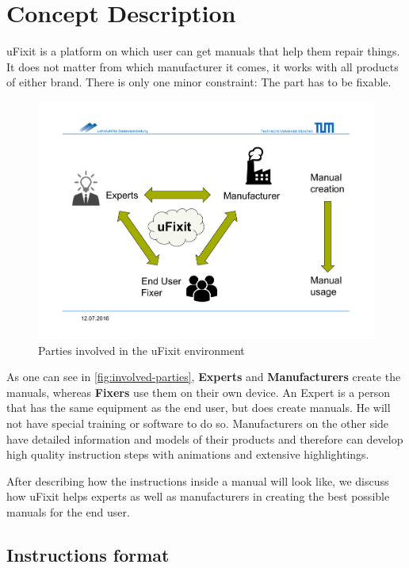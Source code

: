 
\chapter{Concept Description}

	uFixit is a platform on which user can get manuals that help them repair things. It does not matter from which manufacturer it comes, it works with all products of either brand. There is only one minor constraint: The part has to be fixable.
	
	\begin{figure}[H]
		\includegraphics[width=\textwidth, trim=0cm 3cm 0cm 4cm, clip]{../images/involved-parties.pdf}
		\centering
		\caption{Parties involved in the uFixit environment}
		\label{fig:involved-parties}
	\end{figure}

	As one can see in \autoref{fig:involved-parties}, \textbf{Experts} and \textbf{Manufacturers} create the manuals, whereas \textbf{Fixers} use them on their own device. An Expert is a person that has the same equipment as the end user, but does create manuals. He will not have special training or software to do so. Manufacturers on the other side have detailed information and models of their products and therefore can develop high quality instruction steps with animations and extensive highlightings.
	
	After describing how the instructions inside a manual will look like, we discuss how uFixit helps experts as well as manufacturers in creating the best possible manuals for the end user.


	\section{Instructions format}
	
